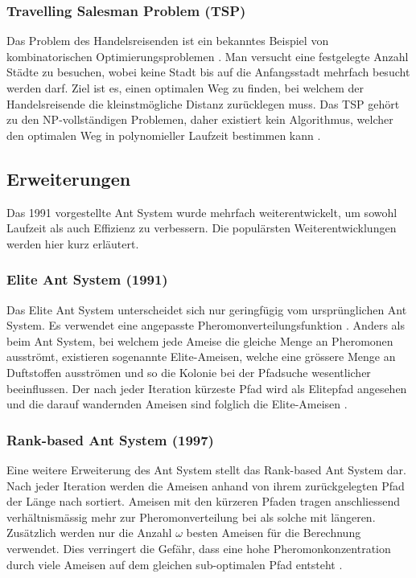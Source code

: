 \subsubsection{Travelling Salesman Problem (TSP)}
Das Problem des Handelsreisenden ist ein bekanntes Beispiel von kombinatorischen Optimierungsproblemen
\cite{Wiki05}. Man versucht eine festgelegte Anzahl Städte zu besuchen, wobei keine Stadt bis auf die
Anfangsstadt mehrfach besucht werden darf. Ziel ist es, einen optimalen Weg zu finden, bei welchem der
Handelsreisende die kleinstmögliche Distanz zurücklegen muss. Das TSP gehört zu den NP-vollständigen
Problemen, daher existiert kein Algorithmus, welcher den optimalen Weg in polynomieller Laufzeit bestimmen
kann \cite{Wiki06}.

\subsection{Erweiterungen}
Das 1991 vorgestellte Ant System wurde mehrfach weiterentwickelt, um sowohl Laufzeit als auch Effizienz zu
verbessern. Die populärsten Weiterentwicklungen werden hier kurz erläutert.

\subsubsection{Elite Ant System (1991)}
Das Elite Ant System unterscheidet sich nur geringfügig vom ursprünglichen Ant System. Es verwendet eine
angepasste Pheromonverteilungsfunktion \cite{MZ14}. Anders als beim Ant System, bei welchem jede Ameise
die gleiche Menge an Pheromonen ausströmt, existieren sogenannte Elite-Ameisen, welche eine grössere Menge
an Duftstoffen ausströmen und so die Kolonie bei der Pfadsuche wesentlicher beeinflussen. Der
nach jeder Iteration kürzeste Pfad wird als Elitepfad angesehen und die darauf wandernden Ameisen sind
folglich die Elite-Ameisen \cite{BHS99}.

\subsubsection{Rank-based Ant System (1997)}
Eine weitere Erweiterung des Ant System stellt das Rank-based Ant System dar. Nach jeder Iteration werden
die Ameisen anhand von ihrem zurückgelegten Pfad der Länge nach sortiert. Ameisen mit den kürzeren Pfaden
tragen anschliessend verhältnismässig mehr zur Pheromonverteilung bei als solche mit längeren. Zusätzlich
werden nur die Anzahl $\omega$ besten Ameisen für die Berechnung verwendet. Dies verringert die Gefähr, dass
eine hohe Pheromonkonzentration durch viele Ameisen auf dem gleichen sub-optimalen Pfad entsteht
\cite{BHS99}.

